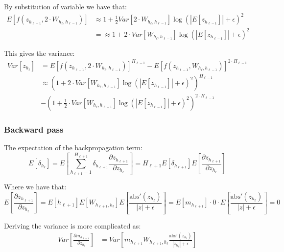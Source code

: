 By substitution of variable we have that:
\begin{equation}
\begin{aligned}
E\left[f(z_{h_{\ell-1}}, 2 \cdot W_{h_{\ell}, h_{\ell-1}})\right] &\approx 1 + \frac{1}{2} Var[2 \cdot W_{h_{\ell}, h_{\ell-1}}] \log(|E[z_{h_{\ell-1}}]| + \epsilon)^2 \\
&= \approx 1 + 2 \cdot Var[W_{h_{\ell}, h_{\ell-1}}] \log(|E[z_{h_{\ell-1}}]| + \epsilon)^2
\end{aligned}
\end{equation}

This gives the variance:
\begin{equation}
\begin{aligned}
Var[z_{h_\ell}] &= E\left[f(z_{h_{\ell-1}}, 2 \cdot W_{h_{\ell}, h_{\ell-1}}) \right]^{H_{\ell-1}}
- E\left[f(z_{h_{\ell-1}}, W_{h_{\ell}, h_{\ell-1}})\right]^{2\cdot H_{\ell-1}} \\
&\approx \left(1 + 2 \cdot Var[W_{h_{\ell}, h_{\ell-1}}] \log(|E[z_{h_{\ell-1}}]| + \epsilon)^2\right)^{H_{\ell-1}} \\
&- \left(1 + \frac{1}{2} \cdot Var[W_{h_{\ell}, h_{\ell-1}}] \log(|E[z_{h_{\ell-1}}]| + \epsilon)^2\right)^{2\cdot H_{\ell-1}}
\end{aligned}
\end{equation}

\subsubsection{Backward pass}

The expectation of the backpropagation term:
\begin{equation}
E[\delta_{h_\ell}] = E\left[\sum_{h_{\ell+1}=1}^{H_{\ell+1}} \delta_{h_{\ell+1}} \frac{\partial z_{h_{\ell+1}}}{\partial z_{h_\ell}}\right] = H_{\ell+1} E[\delta_{h_{\ell+1}}] E\left[\frac{\partial z_{h_{\ell+1}}}{\partial z_{h_\ell}}\right]
\end{equation}

Where we have that:
\begin{equation}
E\left[\frac{\partial z_{h_{\ell+1}}}{\partial z_{h_\ell}}\right] = E[{h_{\ell+1}}] E[W_{h_{\ell+1}, h_{\ell}}] E\left[ \frac{\mathrm{abs}'(z_{h_{\ell}})}{|z| + \epsilon}\right] = E[m_{h_{\ell+1}}] \cdot 0 \cdot E\left[ \frac{\mathrm{abs}'(z_{h_{\ell}})}{|z| + \epsilon}\right] = 0
\end{equation}

Deriving the variance is more complicated as:
\begin{equation}
\begin{aligned}
Var\left[\frac{\partial m_{h_{\ell+1}}}{\partial z_{h_\ell}}\right] &= Var\left[m_{h_{\ell+1}} W_{h_{\ell+1}, h_{\ell}} \frac{\mathrm{abs}'(z_{h_{\ell}})}{|z_{h_{\ell}}| + \epsilon}\right]
\end{aligned}
\end{equation}

